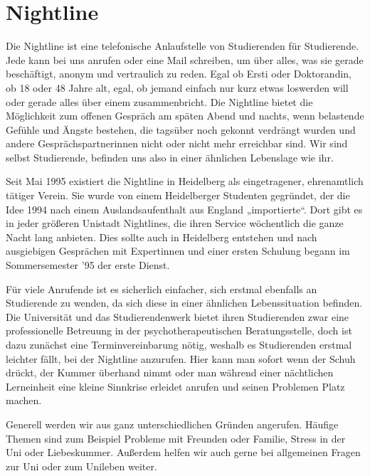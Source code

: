 \section{Nightline}%
Die Nightline ist eine telefonische Anlaufstelle von Studierenden für Studierende. Jede kann bei uns anrufen oder eine Mail schreiben, um über alles, was sie gerade beschäftigt, anonym und vertraulich zu reden. Egal ob Ersti oder Doktorandin, ob 18 oder 48 Jahre alt, egal, ob jemand einfach nur kurz etwas loswerden will oder gerade alles über einem zusammenbricht. Die Nightline bietet die Möglichkeit zum offenen Gespräch am späten Abend und nachts, wenn belastende Gefühle und Ängste bestehen, die tagsüber noch gekonnt verdrängt wurden und andere Gesprächspartnerinnen nicht oder nicht mehr erreichbar sind. Wir sind selbst Studierende, befinden uns also in einer ähnlichen Lebenslage wie ihr.


Seit Mai 1995 existiert die Nightline in Heidelberg als eingetragener, ehrenamtlich tätiger Verein. Sie wurde von einem Heidelberger Studenten gegründet, der die Idee 1994 nach einem Auslandsaufenthalt aus England „importierte“. Dort gibt es in jeder größeren Unistadt Nightlines, die ihren Service wöchentlich die ganze Nacht lang anbieten. Dies sollte auch in Heidelberg entstehen und nach ausgiebigen Gesprächen mit Expertinnen und einer ersten Schulung begann im Sommersemester '95 der erste Dienst.

Für viele Anrufende ist es sicherlich einfacher, sich erstmal ebenfalls an Studierende zu wenden, da sich diese in einer ähnlichen Lebenssituation befinden. Die Universität und das Studierendenwerk bietet ihren Studierenden zwar eine professionelle Betreuung in der psychotherapeutischen Beratungsstelle, doch ist dazu zunächst eine Terminvereinbarung nötig, weshalb es Studierenden erstmal leichter fällt, bei der Nightline anzurufen. Hier kann man sofort wenn der Schuh drückt, der Kummer überhand nimmt oder man während einer nächtlichen Lerneinheit eine kleine Sinnkrise erleidet anrufen und seinen Problemen Platz machen.

Generell werden wir aus ganz unterschiedlichen Gründen angerufen. Häufige Themen sind zum Beispiel Probleme mit Freunden oder Familie, Stress in der Uni oder Liebeskummer. Außerdem helfen wir auch gerne bei allgemeinen Fragen zur Uni oder zum Unileben weiter.

